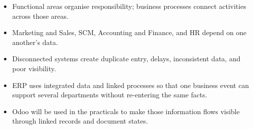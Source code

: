 \begin{chapterrecap}
\begin{itemize}
  \item Functional areas organise responsibility; business processes connect activities across those areas.
  \item Marketing and Sales, SCM, Accounting and Finance, and HR depend on one another's data.
  \item Disconnected systems create duplicate entry, delays, inconsistent data, and poor visibility.
  \item ERP uses integrated data and linked processes so that one business event can support several departments without re-entering the same facts.
  \item Odoo will be used in the practicals to make those information flows visible through linked records and document states.
\end{itemize}
\end{chapterrecap}
